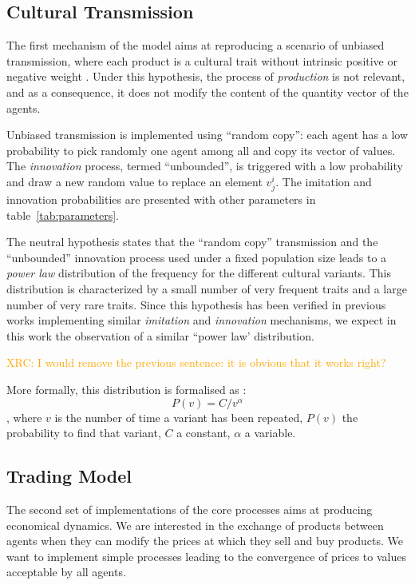 \documentclass{wscpaperproc}
\newcommand{\memo}[2]{\textcolor{#1}{#2}}
\newcommand{\xrc}[1]{\memo{orange}{XRC: #1\\}}
\begin{document}
\subsection{Cultural Transmission}

The first mechanism of the model aims at reproducing a scenario of unbiased transmission, where each product is a cultural trait without intrinsic positive or negative weight \cite{bentley_random_2004,bentley_specialisation_2005,mesoudi_random_2009}. 
Under this hypothesis, the process of \emph{production} is not relevant, and as a consequence, it does not modify the content of the quantity vector of the agents.

Unbiased transmission is implemented using ``random copy'': each agent has a low probability to pick randomly one agent among all and copy its vector of values. The \emph{innovation} process, termed ``unbounded'', is triggered with a low probability and draw a new random value to replace an element $v^i_j$. The imitation and innovation probabilities are presented with other parameters in table~\ref{tab:parameters}.

The neutral hypothesis states that the ``random copy'' transmission and the ``unbounded'' innovation process used under a fixed population size leads to a \emph{power law} distribution of the frequency for the different cultural variants. This distribution is characterized by a small number of very frequent traits and a large number of very rare traits. Since this hypothesis has been verified in previous works implementing similar \emph{imitation} and \emph{innovation} mechanisms, we expect in this work the observation of a similar ``power law' distribution. 

\xrc{I would remove the previous sentence: it is obvious that it works right?}

More formally, this distribution is formalised as : $$P(v)=C/v^\alpha $$, where $v$ is the number of time a variant has been repeated, $P(v)$ the probability to find that variant, $C$ a constant, $\alpha$ a variable. 

\subsection{Trading Model}\label{sec:trade}

The second set of implementations of the core processes aims at producing economical dynamics. We are interested in the exchange of products between agents when they can modify the prices at which they sell and buy products. We want to implement simple processes leading to the convergence of prices to values acceptable by all agents.
\end{document}
